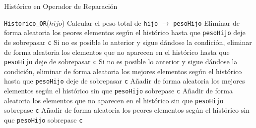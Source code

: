 \begin{algorithm}
\caption{Histórico en Operador de Reparación}\label{alg:Historico_OR}
\begin{algorithmic}[1]
\Procedure \texttt{Historico\_OR}($hijo$)
\State Calcular el peso total de \texttt{hijo} $\xrightarrow{}{}$ \texttt{pesoHijo}
	\State Eliminar de forma aleatoria los peores elementos según el histórico hasta que \texttt{pesoHijo} deje de sobrepasar \texttt{c}
	\State Si no es posible lo anterior y sigue dándose la condición, eliminar de forma aleatoria los elementos que no aparecen en el histórico hasta que \texttt{pesoHijo} deje de sobrepasar \texttt{c}
	\State Si no es posible lo anterior y sigue dándose la condición, eliminar de forma aleatoria los mejores elementos según el histórico hasta que \texttt{pesoHijo} deje de sobrepasar \texttt{c}
\Else
	\State Añadir de forma aleatoria los mejores elementos según el histórico sin que \texttt{pesoHijo} sobrepase \texttt{c}
	\State Añadir de forma aleatoria los elementos que no aparecen en el histórico sin que \texttt{pesoHijo} sobrepase \texttt{c}
	\State Añadir de forma aleatoria los peores	elementos según el histórico sin que \texttt{pesoHijo} sobrepase \texttt{c}
\EndIf
\EndProcedure
\end{algorithmic}
\end{algorithm}

